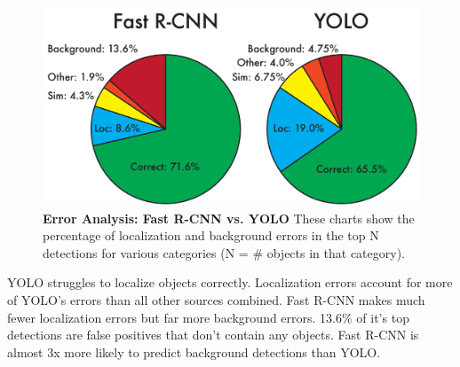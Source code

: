 \documentclass[10pt,twocolumn,letterpaper]{article}
\begin{document}

\begin{figure}[t]
      \centering
        \includegraphics[width=\linewidth]{pie_compare}
      \caption{\small \textbf{Error Analysis: Fast R-CNN vs. YOLO} These charts show the percentage of localization and background errors in the top N detections for various categories (N = \# objects in that category).}
      \label{errors}
   \end{figure}
   
   

YOLO struggles to localize objects correctly. Localization errors account for more of YOLO's errors than all other sources combined. Fast R-CNN makes much fewer localization errors but far more background errors. 13.6\% of it's top detections are false positives that don't contain any objects. Fast R-CNN is almost 3x more likely to predict background detections than YOLO.
\end{document}
